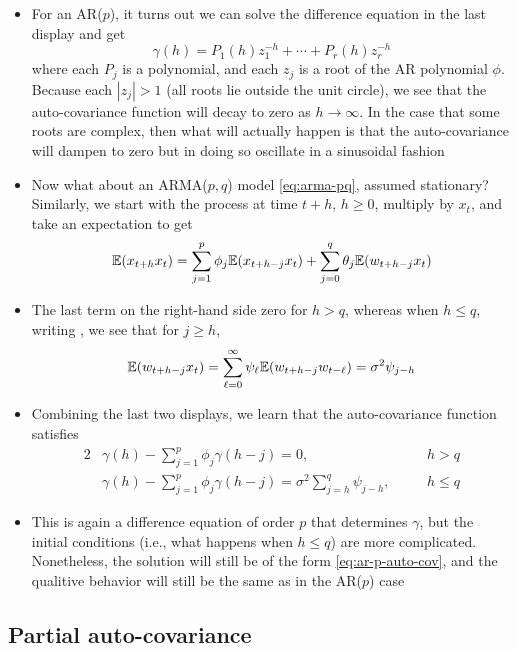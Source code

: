\documentclass{article}
\begin{document}
\begin{itemize}
\item For an AR($p$), it turns out we can solve the difference equation in the
  last display and get
  \begin{equation}
  \label{eq:ar-p-auto-cov}
  \gamma(h) = P_1(h) z_1^{-h} + \cdots + P_r(h) z_r^{-h}
  \end{equation}
  where each $P_j$ is a polynomial, and each $z_j$ is a root of the AR
  polynomial $\phi$. Because each $|z_j| > 1$ (all roots lie outside the unit
  circle), we see that the auto-covariance function will decay to zero as $h \to
  \infty$. In the case that some roots are complex, then what will actually 
  happen is that the auto-covariance will dampen to zero but in doing so
  oscillate in a sinusoidal fashion

\item Now what about an ARMA($p,q$) model \eqref{eq:arma-pq}, assumed
  stationary? Similarly, we start with the process at time $t+h$, $h \geq 0$,
  multiply by $x_t$, and take an expectation to get
  \[
  \mathbb{E}(x_{t+h} x_t) = \sum_{j=1}^p \phi_j \mathbb{E}(x_{t+h-j} x_t) + \sum_{j=0}^q
  \theta_j \mathbb{E}(w_{t+h-j} x_t)  
  \]

\item The last term on the right-hand side zero for $h>q$, whereas when $h \leq
  q$, writing , we see
  that for $j \geq h$, 
  \[
  \mathbb{E}(w_{t+h-j} x_t) = \sum_{\ell=0}^\infty \psi_\ell \mathbb{E}(w_{t+h-j} w_{t-\ell}) =
  \sigma^2 \psi_{j-h}   
  \]

\item Combining the last two displays, we learn that the auto-covariance
  function satisfies 
  \begin{alignat*}{2}
  &\gamma(h) - \sum_{j=1}^p \phi_j \gamma(h-j) = 0, \quad &&h > q \\ 
  &\gamma(h) - \sum_{j=1}^p \phi_j \gamma(h-j) = \sigma^2 \sum_{j=h}^q
    \psi_{j-h}, \quad &&h \leq q
  \end{alignat*}

\item This is again a difference equation of order $p$ that determines $\gamma$,
  but the initial conditions (i.e., what happens when $h \leq q$) are more
  complicated. Nonetheless, the solution will still be of the form
  \eqref{eq:ar-p-auto-cov}, and the qualitive behavior will still be the same as
  in the AR($p$) case  
\end{itemize}

\subsection{Partial auto-covariance}
\end{document}
